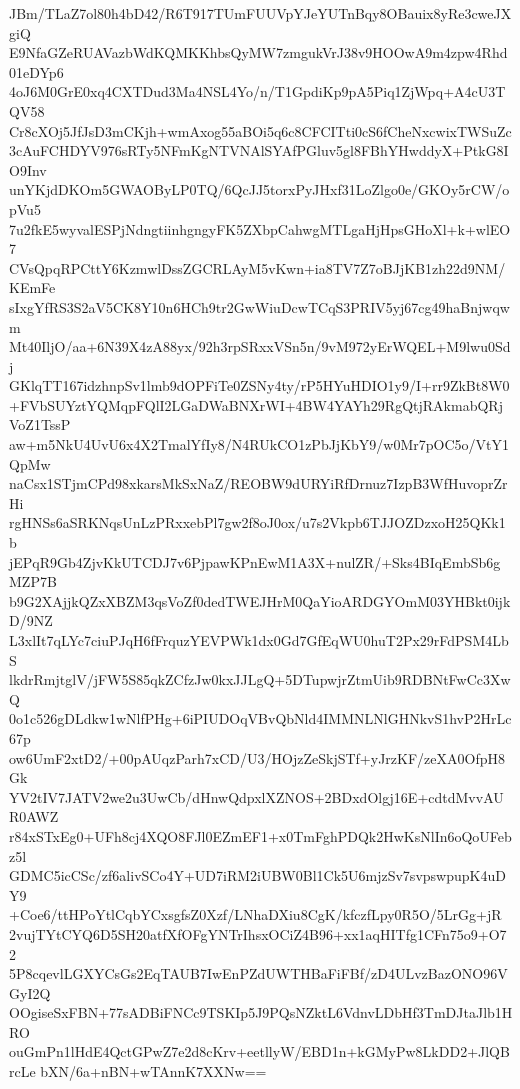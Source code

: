 JBm/TLaZ7ol80h4bD42/R6T917TUmFUUVpYJeYUTnBqy8OBauix8yRe3cweJXgiQ
E9NfaGZeRUAVazbWdKQMKKhbsQyMW7zmgukVrJ38v9HOOwA9m4zpw4Rhd01eDYp6
4oJ6M0GrE0xq4CXTDud3Ma4NSL4Yo/n/T1GpdiKp9pA5Piq1ZjWpq+A4cU3TQV58
Cr8cXOj5JfJsD3mCKjh+wmAxog55aBOi5q6c8CFCITti0cS6fCheNxcwixTWSuZc
3cAuFCHDYV976sRTy5NFmKgNTVNAlSYAfPGluv5gl8FBhYHwddyX+PtkG8IO9Inv
unYKjdDKOm5GWAOByLP0TQ/6QcJJ5torxPyJHxf31LoZlgo0e/GKOy5rCW/opVu5
7u2fkE5wyvalESPjNdngtiinhgngyFK5ZXbpCahwgMTLgaHjHpsGHoXl+k+wlEO7
CVsQpqRPCttY6KzmwlDssZGCRLAyM5vKwn+ia8TV7Z7oBJjKB1zh22d9NM/KEmFe
sIxgYfRS3S2aV5CK8Y10n6HCh9tr2GwWiuDcwTCqS3PRIV5yj67cg49haBnjwqwm
Mt40IljO/aa+6N39X4zA88yx/92h3rpSRxxVSn5n/9vM972yErWQEL+M9lwu0Sdj
GKlqTT167idzhnpSv1lmb9dOPFiTe0ZSNy4ty/rP5HYuHDIO1y9/I+rr9ZkBt8W0
+FVbSUYztYQMqpFQlI2LGaDWaBNXrWI+4BW4YAYh29RgQtjRAkmabQRjVoZ1TssP
aw+m5NkU4UvU6x4X2TmalYfIy8/N4RUkCO1zPbJjKbY9/w0Mr7pOC5o/VtY1QpMw
naCsx1STjmCPd98xkarsMkSxNaZ/REOBW9dURYiRfDrnuz7IzpB3WfHuvoprZrHi
rgHNSs6aSRKNqsUnLzPRxxebPl7gw2f8oJ0ox/u7s2Vkpb6TJJOZDzxoH25QKk1b
jEPqR9Gb4ZjvKkUTCDJ7v6PjpawKPnEwM1A3X+nulZR/+Sks4BIqEmbSb6gMZP7B
b9G2XAjjkQZxXBZM3qsVoZf0dedTWEJHrM0QaYioARDGYOmM03YHBkt0ijkD/9NZ
L3xlIt7qLYc7ciuPJqH6fFrquzYEVPWk1dx0Gd7GfEqWU0huT2Px29rFdPSM4LbS
lkdrRmjtglV/jFW5S85qkZCfzJw0kxJJLgQ+5DTupwjrZtmUib9RDBNtFwCc3XwQ
0o1c526gDLdkw1wNlfPHg+6iPIUDOqVBvQbNld4IMMNLNlGHNkvS1hvP2HrLc67p
ow6UmF2xtD2/+00pAUqzParh7xCD/U3/HOjzZeSkjSTf+yJrzKF/zeXA0OfpH8Gk
YV2tIV7JATV2we2u3UwCb/dHnwQdpxlXZNOS+2BDxdOlgj16E+cdtdMvvAUR0AWZ
r84xSTxEg0+UFh8cj4XQO8FJl0EZmEF1+x0TmFghPDQk2HwKsNlIn6oQoUFebz5l
GDMC5icCSc/zf6alivSCo4Y+UD7iRM2iUBW0Bl1Ck5U6mjzSv7svpswpupK4uDY9
+Coe6/ttHPoYtlCqbYCxsgfsZ0Xzf/LNhaDXiu8CgK/kfczfLpy0R5O/5LrGg+jR
2vujTYtCYQ6D5SH20atfXfOFgYNTrIhsxOCiZ4B96+xx1aqHITfg1CFn75o9+O72
5P8cqevlLGXYCsGs2EqTAUB7IwEnPZdUWTHBaFiFBf/zD4ULvzBazONO96VGyI2Q
OOgiseSxFBN+77sADBiFNCc9TSKIp5J9PQsNZktL6VdnvLDbHf3TmDJtaJlb1HRO
ouGmPn1lHdE4QctGPwZ7e2d8cKrv+eetllyW/EBD1n+kGMyPw8LkDD2+JlQBrcLe
bXN/6a+nBN+wTAnnK7XXNw==
